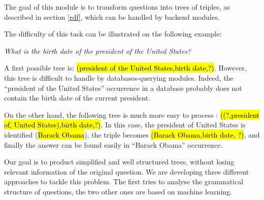 
The goal of this module is to transform questions into trees of triples, as described in section \ref{rdf}, which can be handled by backend modules.

The difficulty of this task can be illustrated on the following example: 
\begin{center}
 \textit{What is the birth date of the president of the United States?}
\end{center}

A first possible tree is: \hl{(president of the United States,birth date,?)}. However, this tree is difficult to handle by databases-querying modules. Indeed, the ``president of the United States'' occurrence in a database probably does not contain the birth date of the current president. 

On the other hand, the following tree is much more easy to process : \hl{((?,president of, United States),birth date,?)}. In this case, the president of United States is identified (\hl{Barack Obama}), the triple becomes \hl{(Barack Obama,birth date, ?)}, and finally the answer can be found easily in ``Barack Obama'' occurrence.

Our goal is to product simplified and well structured trees, without losing relevant information of the original question. We are developing three different approaches to tackle this problem. The first tries to analyse the grammatical structure of questions, the two other ones are based on machine learning.